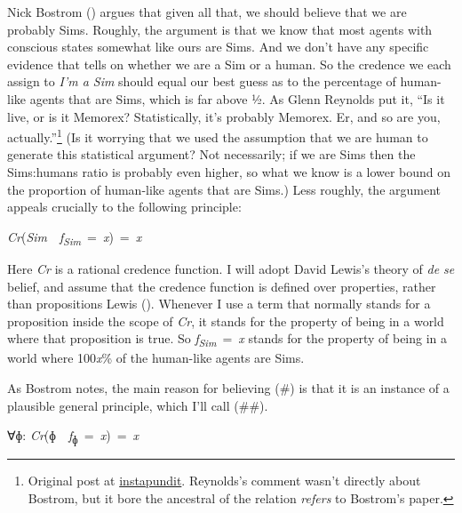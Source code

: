 \documentclass[
  11pt,
  letterpaper,
  DIV=11,
  numbers=noendperiod,
  twoside]{scrartcl}
\providecommand{\tightlist}{%
  \setlength{\itemsep}{0pt}\setlength{\parskip}{0pt}}
\begin{document}
Nick Bostrom () argues that given all
that, we should believe that we are probably Sims. Roughly, the argument
is that we know that most agents with conscious states somewhat like
ours are Sims. And we don't have any specific evidence that tells on
whether we are a Sim or a human. So the credence we each assign to
\emph{I'm a Sim} should equal our best guess as to the percentage of
human-like agents that are Sims, which is far above ½. As Glenn Reynolds
put it, ``Is it live, or is it Memorex? Statistically, it's probably
Memorex. Er, and so are you, actually.''\footnote{Original post at
  \href{http://www.instapundit.com/archives/003465.php\#003465}{instapundit}.
  Reynolds's comment wasn't directly about Bostrom, but it bore the
  ancestral of the relation \emph{refers} to Bostrom's paper.} (Is it
worrying that we used the assumption that we are human to generate this
statistical argument? Not necessarily; if we are Sims then the
Sims:humans ratio is probably even higher, so what we know is a lower
bound on the proportion of human-like agents that are Sims.) Less
roughly, the argument appeals crucially to the following principle:

\begin{description}
\tightlist
\item[(\#)]
\emph{Cr}(\emph{Sim}~\textbar~\emph{f\textsubscript{Sim}}~=~\emph{x})~=~\emph{x}
\end{description}

Here \emph{Cr} is a rational credence function. I will adopt David
Lewis's theory of \emph{de se} belief, and assume that the credence
function is defined over properties, rather than propositions Lewis
(). Whenever I use a term that normally
stands for a proposition inside the scope of \emph{Cr}, it stands for
the property of being in a world where that proposition is true. So
\emph{f\textsubscript{Sim}}~=~\emph{x} stands for the property of being
in a world where 100\emph{x}\% of the human-like agents are Sims.

As Bostrom notes, the main reason for believing (\#) is that it is an
instance of a plausible general principle, which I'll call (\#\#).

\begin{description}
\tightlist
\item[(\#\#)]
∀ɸ:
\emph{Cr}(ɸ~\textbar~\emph{f}\textsubscript{ɸ}~=~\emph{x})~=~\emph{x}
\end{description}
\end{document}
